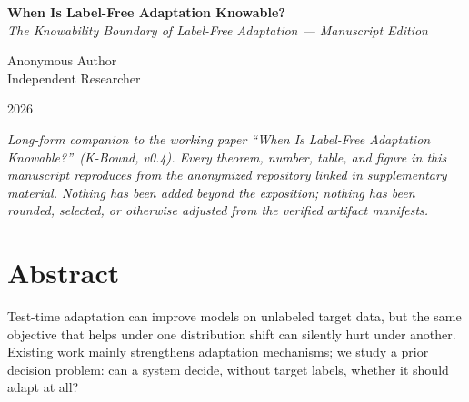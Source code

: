 
\begin{titlepage}
\centering
\vspace*{2.5cm}

{\Huge\bfseries When Is Label-Free Adaptation Knowable?}\\[1.2em]
{\large\itshape The Knowability Boundary of Label-Free Adaptation --- Manuscript Edition}

\vspace{2.5cm}

{\LARGE Anonymous Author}\\[0.6em]
{\large Independent Researcher}

\vspace{3cm}

{\large 2026}

\vspace{3.5cm}

\begin{minipage}{0.78\textwidth}
\small\itshape
Long-form companion to the working paper ``When Is Label-Free
Adaptation Knowable?''\ (K-Bound, v0.4).
Every theorem, number, table, and figure in this manuscript reproduces
from the anonymized repository linked in supplementary material.
Nothing has been added beyond the exposition; nothing has been rounded,
selected, or otherwise adjusted from the verified artifact manifests.
\end{minipage}

\vfill
\end{titlepage}

\chapter*{Abstract}

Test-time adaptation can improve models on unlabeled target data, but the same
objective that helps under one distribution shift can silently hurt under another.
Existing work mainly strengthens adaptation mechanisms; we study a prior decision
problem: can a system decide, without target labels, whether it should adapt at all?

